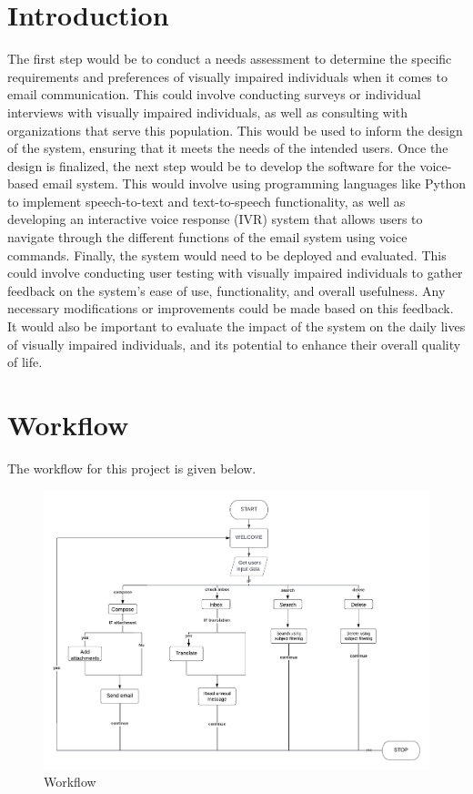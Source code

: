 \documentclass[12pt]{report}
\begin{document}
\section{Introduction}
The first step would be to conduct a needs assessment to determine the specific requirements and preferences of visually impaired individuals when it comes to email communication. This could involve conducting surveys or individual interviews with visually impaired individuals, as well as consulting with organizations that serve this population. This would be used to inform the design of the system, ensuring that it meets the needs of the intended users.\newline \newline
Once the design is finalized, the next step would be to develop the software for the voice-based email system. This would involve using programming languages like Python to implement speech-to-text and text-to-speech functionality, as well as developing an interactive voice response (IVR) system that allows users to navigate through the different functions of the email system using voice commands. \newline \newline
Finally, the system would need to be deployed and evaluated. This could involve conducting user testing with visually impaired individuals to gather feedback on the system's ease of use, functionality, and overall usefulness. Any necessary modifications or improvements could be made based on this feedback. It would also be important to evaluate the impact of the system on the daily lives of visually impaired individuals, and its potential to enhance their overall quality of life.

\section{Workflow}
The workflow for this project is given below.

\begin{figure}[htbp]
\begin{center}
  \includegraphics[scale=0.60]{5.png}
  \caption{Workflow} 

   \label{fig:is}
\end{center}
\end{figure}
\end{document}
